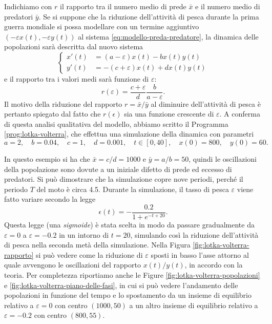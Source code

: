 Indichiamo con $r$ il rapporto tra il numero medio di prede $\bar{x}$ e il
numero medio di predatori $\bar{y}$. Se si suppone che la riduzione dell'attività
di pesca durante la prima guerra mondiale si possa modellare con un termine aggiuntivo
$(-\varepsilon x(t), -\varepsilon y(t))$ al sistema \eqref{eq:modello-preda-predatore},
la dinamica delle popolazioni sarà descritta dal nuovo sistema
\begin{equation} \label{eq:modello-preda-predatore-epsilon}
\left\{
\begin{aligned}
x'(t) &=  (a-\varepsilon)x(t) -bx(t)y(t) \\
y'(t) &= -(c+\varepsilon)x(t) +dx(t)y(t)
\end{aligned}
\right.
\end{equation}
e il rapporto tra i valori medi sarà funzione di $\varepsilon$:
\[
r(\varepsilon) = \frac{c+\varepsilon}{d} \frac{b}{a-\varepsilon}.
\]
Il motivo della riduzione del rapporto $r = \bar{x}/\bar{y}$  al diminuire
dell'attività di pesca è pertanto spiegato dal fatto che $r(\epsilon)$ sia
una funzione crescente di $\varepsilon$.
A conferma di questa analisi qualitativa del modello, abbiamo scritto il
Programma \ref{prog:lotka-volterra}, che effettua una simulazione della
dinamica con parametri
\[
a = 2, \quad
b = 0.04, \quad
c = 1, \quad
d = 0.001, \quad
t \in [0,40], \quad
x(0) = 800, \quad
y(0) = 60.
\]



\noindent In questo esempio si ha che $\bar{x} = c/d = 1000$ e $\bar{y} = a/b = 50$,
quindi le oscillazioni della popolazione sono dovute a un iniziale difetto
di prede ed eccesso di predatori. Si può dimostrare che la simulazione
copre nove periodi, perché il periodo $T$ del moto è circa 4.5.
Durante la simulazione, il tasso di pesca $\varepsilon$ viene fatto variare
secondo la legge
\[
\epsilon(t) = -\frac{0.2}{1+e^{-t+20}}.
\]
Questa legge (una \emph{sigmoide}) è stata scelta in modo da passare gradualmente
da $\varepsilon = 0$ a $\varepsilon = -0.2$ in un intorno di $t = 20$,
simulando così la riduzione dell'attività di pesca nella seconda metà
della simulazione. Nella Figura \ref{fig:lotka-volterra-rapporto}
si può vedere come la riduzione di $\varepsilon$ sposti in basso
l'asse attorno al quale avvengono le oscillazioni del rapporto $x(t)/y(t)$,
in accordo con la teoria.
Per completezza riportiamo anche le Figure \ref{fig:lotka-volterra-popolazioni}
e \ref{fig:lotka-volterra-piano-delle-fasi}, in cui si può vedere l'andamento
delle popolazioni in funzione del tempo e lo spostamento da un insieme
di equilibrio relativo a $\varepsilon = 0$ con centro $(1000,50)$ a un altro
insieme di equilibrio relativo a $\varepsilon = -0.2$ con centro $(800,55)$.

